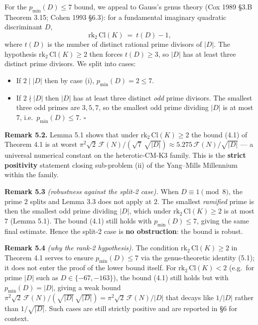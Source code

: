 \documentclass[
  11pt,
  a4paper,
]{amsart}
\providecommand{\tightlist}{\setlength{\itemsep}{0pt}\setlength{\parskip}{0pt}}
\providecommand{\tightlist}{%
  \setlength{\itemsep}{0pt}\setlength{\parskip}{0pt}}
\begin{document}
For the \(p_{\min}(D) \le 7\) bound, we appeal to Gauss's genus theory (Cox 1989 §3.B Theorem 3.15; Cohen 1993 §6.3): for a fundamental imaginary quadratic discriminant \(D\),
\[
\mathrm{rk}_2\, \mathrm{Cl}(K)\ =\ t(D) - 1,
\tag{5.1}
\]
where \(t(D)\) is the number of distinct rational prime divisors of \(|D|\). The hypothesis \(\mathrm{rk}_2\, \mathrm{Cl}(K) \ge 2\) then forces \(t(D) \ge 3\), so \(|D|\) has at least three distinct prime divisors. We split into cases:

\begin{itemize}
\tightlist
\item
  If \(2 \mid |D|\) then by case (i), \(p_{\min}(D) = 2 \le 7\).
\item
  If \(2 \nmid |D|\) then \(|D|\) has at least three distinct \emph{odd} prime divisors. The smallest three odd primes are \(3, 5, 7\), so the smallest odd prime dividing \(|D|\) is at most \(7\), i.e.~\(p_{\min}(D) \le 7\). \(\square\)
\end{itemize}

\textbf{Remark 5.2.} Lemma 5.1 shows that under \(\mathrm{rk}_2\, \mathrm{Cl}(K) \ge 2\) the bound (4.1) of Theorem 4.1 is at worst \(\pi^2 \sqrt{2}\, \mathcal{F}(N) / (\sqrt{7}\,\sqrt{|D|}) \approx 5.275\, \mathcal{F}(N) / \sqrt{|D|}\) --- a universal numerical constant on the heterotic-CM-K3 family. This is the \textbf{strict positivity} statement closing sub-problem (ii) of the Yang--Mills Millennium within the family.

\textbf{Remark 5.3} \emph{(robustness against the split-2 case).} When \(D \equiv 1 \pmod 8\), the prime \(2\) splits and Lemma 3.3 does not apply at \(2\). The smallest \emph{ramified} prime is then the smallest odd prime dividing \(|D|\), which under \(\mathrm{rk}_2\, \mathrm{Cl}(K) \ge 2\) is at most \(7\) (Lemma 5.1). The bound (4.1) still holds with \(p_{\min}(D) \le 7\), giving the same final estimate. Hence the split-2 case is \textbf{no obstruction}: the bound is robust.

\textbf{Remark 5.4} \emph{(why the rank-2 hypothesis).} The condition \(\mathrm{rk}_2\, \mathrm{Cl}(K) \ge 2\) in Theorem 4.1 serves to ensure \(p_{\min}(D) \le 7\) via the genus-theoretic identity (5.1); it does not enter the proof of the lower bound itself. For \(\mathrm{rk}_2\, \mathrm{Cl}(K) < 2\) (e.g.~for prime \(|D|\) such as \(D \in \{-67, -163\}\)), the bound (4.1) still holds but with \(p_{\min}(D) = |D|\), giving a weak bound \(\pi^2 \sqrt{2}\, \mathcal{F}(N) / (\sqrt{|D|}\,\sqrt{|D|}) = \pi^2 \sqrt{2}\, \mathcal{F}(N) / |D|\) that decays like \(1/|D|\) rather than \(1/\sqrt{|D|}\). Such cases are still strictly positive and are reported in §6 for context.
\end{document}
